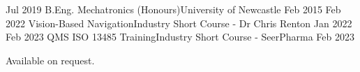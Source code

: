 %
%
%

 \begin{education}
	\school
		{Jul 2019}	{B.Eng. Mechatronics (Honours)}{University of Newcastle}
		{Feb 2015}
	\emptySeparator
	\school
		{Feb 2022}	{Vision-Based Navigation}{Industry Short Course - Dr Chris Renton}
		{Jan 2022}
	\emptySeparator
	\school
		{Feb 2023}	{QMS ISO 13485 Training}{Industry Short Course - SeerPharma}
		{Feb 2023}
	\emptySeparator
 \end{education}

\vspace{0.5em}
Available on request.
